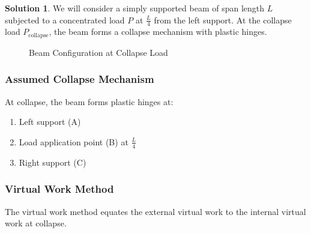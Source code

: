 \documentclass[12pt]{article}
\theoremstyle{definition} %
\newtheorem{solution}{Solution}
\theoremstyle{plain} %
\begin{document}
\pagebreak
\begin{solution}
\noindent

We will consider a simply supported beam of span length $ L $ subjected to a concentrated load $ P $ at $ \frac{L}{4} $ from the left support. At the collapse load $ P_{\text{collapse}} $, the beam forms a collapse mechanism with plastic hinges.

\begin{figure}[h!]
\centering
{}
\caption{Beam Configuration at Collapse Load}
\end{figure}

\subsubsection*{Assumed Collapse Mechanism}

At collapse, the beam forms plastic hinges at:
\begin{enumerate}
    \item Left support (A)
    \item Load application point (B) at $ \frac{L}{4} $
    \item Right support (C)
\end{enumerate}

\subsubsection*{Virtual Work Method}

The virtual work method equates the external virtual work to the internal virtual work at collapse.


\end{solution}
\end{document}

